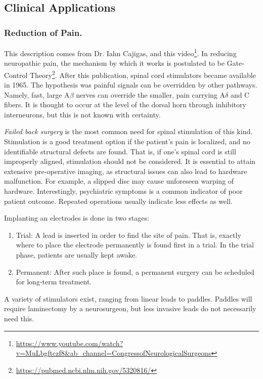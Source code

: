 \documentclass[12pt]{report}
\begin{document}
\subsection{Clinical Applications}

\subsubsection{Reduction of Pain.}
This description comes from Dr. Iahn Cajigas, and this video\footnote{\url{https://www.youtube.com/watch?v=MuLbgftczf8\&ab_channel=CongressofNeurologicalSurgeons}}. In reducing neuropathic pain, the mechanism by which it works is postulated to be Gate-Control Theory\footnote{\url{https://pubmed.ncbi.nlm.nih.gov/5320816/}}. After this publication, spinal cord stimulators became available in 1965. The hypothesis was painful signals can be overridden by other pathways. Namely, fast, large A$\beta$ nerves can override the smaller, pain carrying A$\delta$ and C fibers. It is thought to occur at the level of the dorsal horn through inhibitory interneurons, but this is not known with certainty.\newline

\textit{Failed back surgery} is the most common need for spinal stimulation of this kind. Stimulation is a good treatment option if the patient's pain is localized, and no identifiable structural defects are found. That is, if one's spinal cord is still improperly aligned, stimulation should not be considered. It is essential to attain extensive pre-operative imaging, as structural issues can also lead to hardware malfunction. For example, a slipped disc may cause unforeseen warping of hardware. Interestingly, psychiatric symptoms is a common indicator of poor patient outcome. Repeated operations usually indicate less effects as well.\newline

Implanting an electrodes is done in two stages:
\begin{enumerate}
    \item Trial: A lead is inserted in order to find the site of pain. That is, exactly where to place the electrode permanently is found first in a trial. In the trial phase, patients are usually kept awake. 
    \item Permanent: After such place is found, a permanent surgery can be scheduled for long-term treatment. 
\end{enumerate}

A variety of stimulators exist, ranging from linear leads to paddles. Paddles will require laminectomy by a neurosurgeon, but less invasive leads do not necessarily need this.\newline
\end{document}
